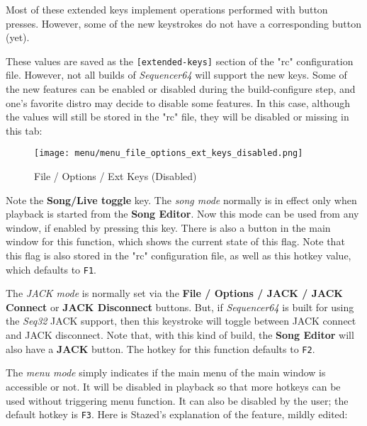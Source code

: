    Most of these extended keys implement operations performed with button
   presses.  However, some of the new keystrokes do not have a corresponding
   button (yet).

   These values are saved as the \texttt{[extended-keys]} section of the "rc"
   configuration file.  However, not all builds of \textsl{Sequencer64} will
   support the new keys.  Some of the new features can be enabled or disabled
   during the build-configure step, and one's favorite distro may decide to
   disable some features.  In this case, although the values will still be
   stored in the "rc" file, they will be disabled or missing in this tab:

\begin{figure}[H]
   \centering 
   \texttt{[image: menu/menu\_file\_options\_ext\_keys\_disabled.png]}
   \caption{File / Options / Ext Keys (Disabled)}
   \label{fig:seq64_menu_file_options_ext_keys_disabled}
\end{figure}

   Note the \textbf{Song/Live toggle} key.
   The \textsl{song mode} normally is in effect only when playback is started
   from the \textbf{Song Editor}.  Now this mode can be used from any
   window, if enabled by pressing this key.  There is also
   a button in the main window for this function, which shows the current state
   of this flag.  Note that this flag is also stored in the "rc" configuration
   file, as well as this hotkey value, which defaults to \texttt{F1}.

   The \textsl{JACK mode} is normally set via the
   \textbf{File / Options / JACK / JACK Connect} or 
   \textbf{JACK Disconnect} buttons.
   But, if \textsl{Sequencer64} is built for using the \textsl{Seq32} JACK
   support, then this keystroke will toggle between JACK connect and JACK
   disconnect.
   Note that, with this kind of build, the \textbf{Song Editor} will also have
   a \textbf{JACK} button.
   The hotkey for this function defaults to \texttt{F2}.

   The \textsl{menu mode} simply indicates if the main menu of the
   main window is accessible or not.  It will be disabled in playback
   so that more hotkeys can be used without triggering menu function.
   It can also be disabled by the user; the default hotkey is \texttt{F3}.
   Here is Stazed's explanation of the feature, mildly edited:


